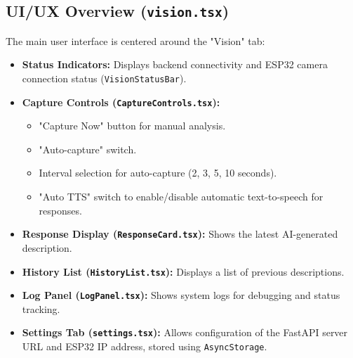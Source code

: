 \documentclass[12pt, a4paper]{report}
\begin{document}
\subsection{UI/UX Overview (\texttt{vision.tsx})}
The main user interface is centered around the "Vision" tab:
\begin{itemize}
    \item \textbf{Status Indicators:} Displays backend connectivity and ESP32 camera connection status (\texttt{VisionStatusBar}).
    \item \textbf{Capture Controls (\texttt{CaptureControls.tsx}):}
        \begin{itemize}
            \item "Capture Now" button for manual analysis.
            \item "Auto-capture" switch.
            \item Interval selection for auto-capture (2, 3, 5, 10 seconds).
            \item "Auto TTS" switch to enable/disable automatic text-to-speech for responses.
        \end{itemize}
    \item \textbf{Response Display (\texttt{ResponseCard.tsx}):} Shows the latest AI-generated description.
    \item \textbf{History List (\texttt{HistoryList.tsx}):} Displays a list of previous descriptions.
    \item \textbf{Log Panel (\texttt{LogPanel.tsx}):} Shows system logs for debugging and status tracking.
    \item \textbf{Settings Tab (\texttt{settings.tsx}):} Allows configuration of the FastAPI server URL and ESP32 IP address, stored using \texttt{AsyncStorage}.
\end{itemize}
\end{document}
